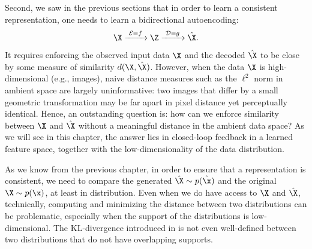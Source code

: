 \documentclass[../../book-main.tex]{subfiles}
\begin{document}
Second, we saw in the previous sections that in order to learn a
consistent representation, one needs to learn a bidirectional autoencoding:
\begin{equation}
    \X
    \xrightarrow{\hspace{1mm} \mathcal{E} = f \hspace{1mm}} \Z
    \xrightarrow{\hspace{1mm} \mathcal{D} = g \hspace{1mm}} \hat{\X}.
\end{equation}
It requires enforcing the observed input data $\X$ and the decoded
$\hat \X$ to be close by some measure of similarity $d(\X, \hat \X)$.
However, when the data $\X$ is high-dimensional (e.g., images), naive
distance measures such as the $\ell^2$ norm in ambient space are
largely uninformative: two images that differ by a small geometric
transformation may be far apart in pixel distance yet perceptually
identical. Hence, an outstanding question is: how can we enforce
similarity between $\X$ and $\hat \X$ without a meaningful distance
in the ambient data space? As we will see in this chapter, the answer
lies in closed-loop feedback in a learned feature space, together with
the low-dimensionality of the data distribution.

As we know from the previous chapter, in order to ensure that a
representation is consistent, we need to compare the generated $\hat
\X \sim p(\hat\x)$ and the original $\X \sim p(\x)$, at least in
distribution. Even when we do have access to $\X$ and $\hat \X$,
technically, computing and minimizing the distance between two
distributions can be problematic, especially when the support of the
distributions is low-dimensional. The KL-divergence introduced in
 is not even well-defined between two
distributions that do not have overlapping supports.
\end{document}
